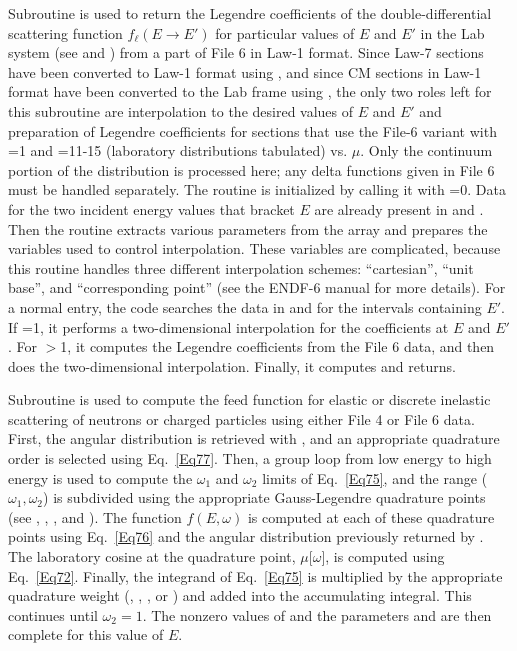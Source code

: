 Subroutine 
is used to return the Legendre coefficients of the
double-differential scattering function $f_\ell(E{\rightarrow}E')$
for particular values of $E$ and $E'$ in the Lab system (see 
and ) from a part of File 6 in Law-1 format.  Since Law-7
sections have been converted to Law-1 format using , and
since CM sections in Law-1 format have been converted to the Lab frame
using , the only two roles left for this subroutine are
interpolation to the desired values of $E$ and $E'$ and preparation
of Legendre coefficients for sections that use the File-6 variant with
=1 and =11-15 (laboratory distributions tabulated)
vs. $\mu$.  Only the continuum portion of the distribution is processed
here; any delta functions given in File 6 must be handled separately.
The routine is initialized by calling it with =0.  Data
for the two incident energy values that bracket $E$ are already present
in  and .  Then the routine extracts
various parameters from the  array and prepares the variables
used to control interpolation.  These variables are complicated, because
this routine handles three different interpolation schemes: ``cartesian'',
``unit base'', and ``corresponding point'' (see the ENDF-6
manual\cite{ENDF102} for more details).  For a normal entry, the code searches
the data in  and  for the intervals containing $E'$.
If =1, it performs a two-dimensional interpolation for the
 coefficients at $E$ and $E'$.  For $>$1, it computes
the Legendre coefficients from the File 6 data, and then
does the two-dimensional interpolation.  Finally, it computes
 and returns.

Subroutine  is used
to compute the feed function for elastic or discrete inelastic
scattering of neutrons or charged particles using either File 4
or File 6 data.  First, the angular distribution is retrieved
with , and an appropriate quadrature order is
selected using Eq.~\ref{Eq77}.  Then, a group loop from low energy to
high energy is used to compute the $\omega_1$ and $\omega_2$ limits of
Eq.~\ref{Eq75}, and the range ($\omega_1,\omega_2$) is subdivided using
the appropriate Gauss-Legendre quadrature points (see ,
, , and ).  The function $f(E,\omega)$
is computed at each of these quadrature points using Eq.~\ref{Eq76}
and the angular distribution previously returned by
.  The laboratory cosine
at the quadrature point, $\mu\bigl[\omega\bigr]$, is computed
using Eq.~\ref{Eq72}.  Finally, the integrand of Eq.~\ref{Eq75}
is multiplied by the appropriate quadrature weight (,
, , or ) and added into the
accumulating integral.  This continues until $\omega_2=1$.
The nonzero values of  and the parameters 
and  are then complete for this value of $E$.

